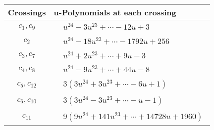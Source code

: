 \documentclass[1p]{elsarticle_modified}
\theoremstyle{definition}
\begin{document}
\begin{tabular}{m{50pt}|m{274pt}}
Crossings & \hspace{64pt}u-Polynomials at each crossing \\
\hline $$\begin{aligned}c_{1},c_{9}\end{aligned}$$&$\begin{aligned}
&u^{24}-3 u^{23}+\cdots-12 u+3
\end{aligned}$\\
\hline $$\begin{aligned}c_{2}\end{aligned}$$&$\begin{aligned}
&u^{24}-18 u^{23}+\cdots-1792 u+256
\end{aligned}$\\
\hline $$\begin{aligned}c_{3},c_{7}\end{aligned}$$&$\begin{aligned}
&u^{24}+2 u^{23}+\cdots+9 u-3
\end{aligned}$\\
\hline $$\begin{aligned}c_{4},c_{8}\end{aligned}$$&$\begin{aligned}
&u^{24}-9 u^{23}+\cdots+44 u-8
\end{aligned}$\\
\hline $$\begin{aligned}c_{5},c_{12}\end{aligned}$$&$\begin{aligned}
&3(3 u^{24}+3 u^{23}+\cdots-6 u+1)
\end{aligned}$\\
\hline $$\begin{aligned}c_{6},c_{10}\end{aligned}$$&$\begin{aligned}
&3(3 u^{24}-3 u^{23}+\cdots- u-1)
\end{aligned}$\\
\hline $$\begin{aligned}c_{11}\end{aligned}$$&$\begin{aligned}
&9(9 u^{24}+141 u^{23}+\cdots+14728 u+1960)
\end{aligned}$\\
\hline
\end{tabular}\\~\\
\newpage\renewcommand{\arraystretch}{1}
\end{document}
